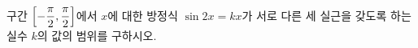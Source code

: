 구간 $\left[-\dfrac{\pi}{2}{,}\mkern3mu\mathopen{}\dfrac{\pi}{2}\right]$에서 $x$에 대한 방정식 $\sin 2x=kx$가 서로 다른 세 실근을 갖도록 하는 실수 $k$의 값의 범위를 구하시오.
